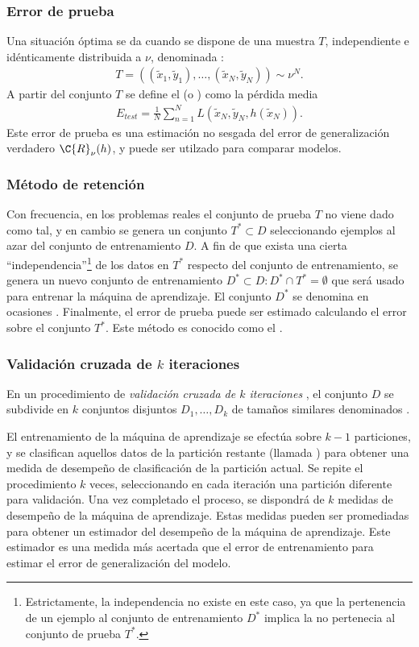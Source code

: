 \subsubsection{Error de prueba}
%
Una situación óptima se da cuando se dispone de una muestra $T$,
independiente e idénticamente distribuida a $\nu$, denominada
:
%
\begin{align}
  T=((\tilde{x}_1,\tilde{y}_1),\ldots,(\tilde{x}_N,\tilde{y}_N))\sim\nu^N.
  \label{eq:conj-prueba}
\end{align}
%
A partir del conjunto $T$ se define el 
(o ) como la pérdida media
%
\begin{align}
  E_{test}=\frac{1}{N}\sum_{n=1}^N
  L(\tilde{x}_N,\tilde{y}_N,h(\tilde{x}_N)).
  \label{eq:error-prueba}
\end{align}
%
Este error de prueba es una estimación no sesgada del error de
generalización verdadero $\C{R}_\nu(h)$, y puede ser utilzado para
comparar modelos.
%
\subsubsection{Método de retención}
\label{retención}
%
Con frecuencia, en los problemas reales el conjunto de prueba $T$ no
viene dado como tal, y en cambio se genera un conjunto $T^*\subset{}D$
seleccionando ejemplos al azar del conjunto de entrenamiento $D$.  A
fin de que exista una cierta ``independencia''\footnote{Estrictamente,
  la independencia no existe en este caso, ya que la pertenencia de un
  ejemplo al conjunto de entrenamiento $D^*$ implica la no pertenecia
  al conjunto de prueba $T^*$.} de los datos en $T^*$ respecto del
conjunto de entrenamiento, se genera un nuevo conjunto de entrenamiento
$D^*\subset{}D:D^*\cap{}T^*=\emptyset$ que será usado para entrenar la
máquina de aprendizaje. El conjunto $D^*$ se denomina en ocasiones
.
Finalmente, el error de prueba puede ser estimado calculando el error
sobre el conjunto $T^*$. Este método es conocido como el .
%
\subsubsection{Validación cruzada de $k$ iteraciones}
%
En un procedimiento de \emph{validación cruzada de $k$ iteraciones}
\cite{crossval}, el conjunto $D$ se subdivide en $k$ conjuntos
disjuntos $D_1,\ldots,D_k$ de tamaños similares denominados
.

El entrenamiento de la máquina de aprendizaje se efectúa sobre $k-1$
particiones, y se clasifican aquellos datos de la partición restante
(llamada ) para obtener una medida de desempeño de
clasificación de la partición actual. Se repite el procedimiento $k$
veces, seleccionando en cada iteración una partición diferente para
validación.  Una vez completado el proceso, se dispondrá de $k$
medidas de desempeño de la máquina de aprendizaje. Estas medidas
pueden ser promediadas para obtener un estimador del desempeño de la
máquina de aprendizaje. Este estimador es una medida más acertada que
el error de entrenamiento para estimar el error de generalización del
modelo.

